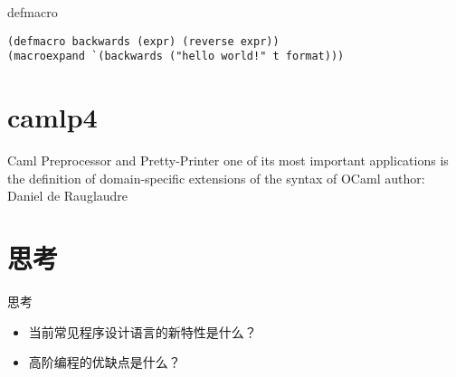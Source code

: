 \begin{frame}[containsverbatim]{defmacro}
\lstset{language=lisp}
\begin{lstlisting}
(defmacro backwards (expr) (reverse expr))
(macroexpand `(backwards ("hello world!" t format)))
\end{lstlisting}
\end{frame}

\section{camlp4}

Caml Preprocessor and Pretty-Printer
one of its most important applications is the definition of domain-specific extensions of the syntax of OCaml
author: Daniel de Rauglaudre
\section{思考}
\begin{frame}{思考}
\begin{itemize}
\item 当前常见程序设计语言的新特性是什么？
\item 高阶编程的优缺点是什么？
\end{itemize}
\end{frame}


